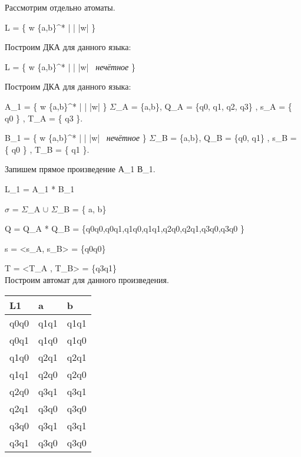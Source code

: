 \documentclass[fleqn]{article}
\begin{document}
Рассмотрим отдельно атоматы.

L = \{ w \in \{a,b\}^* \; | \; | |w| \}

Построим ДКА для данного языка:


L = \{ w \in \{a,b\}^* \; | \; | |w| \ \textit{нечётное} \}

Построим ДКА для данного языка:

            

A_1 =  \{ w \in \{a,b\}^* \; | \; | |w| \} $\Sigma$_A = \{a,b\}, Q_A = \{q0, q1, q2, q3\} , s_A = \{ q0 \} , T_A = \{ q3 \}.
 
 B_1 =  \{ w \in \{a,b\}^* \; | \; | |w| \ \textit{нечётное} \} $\Sigma$_B = \{a,b\}, Q_B = \{q0, q1\} , s_B = \{ q0 \} , T_B = \{ q1 \}.
 
 Запишем прямое произведение А_1 В_1.
 
 L_1 = A_1 * B_1
 
 $\sigma$ = $\Sigma$_A $\cup$ $\Sigma$_B = \{ a, b\}
 
 Q = Q_A * Q_B = \{q0q0,q0q1,q1q0,q1q1,q2q0,q2q1,q3q0,q3q0 \}
 
 s = <s_A, s_B> = \{q0q0\}
 
 T = <T_A , T_B> = \{q3q1\}
 \\
 
 Построим автомат для данного произведения.
 
 \begin{tabular}{ | l | l | l | }
\hline
L1 & a & b \\ \hline
q0q0 & q1q1  & q1q1 \\
q0q1 & q1q0  & q1q0 \\
q1q0 & q2q1  & q2q1 \\
q1q1 & q2q0  & q2q0 \\
q2q0 & q3q1  & q3q1 \\
q2q1 & q3q0  & q3q0 \\
q3q0 & q3q1  & q3q1 \\
q3q1 & q3q0  & q3q0 \\
\hline
\end{tabular}
\end{document}
